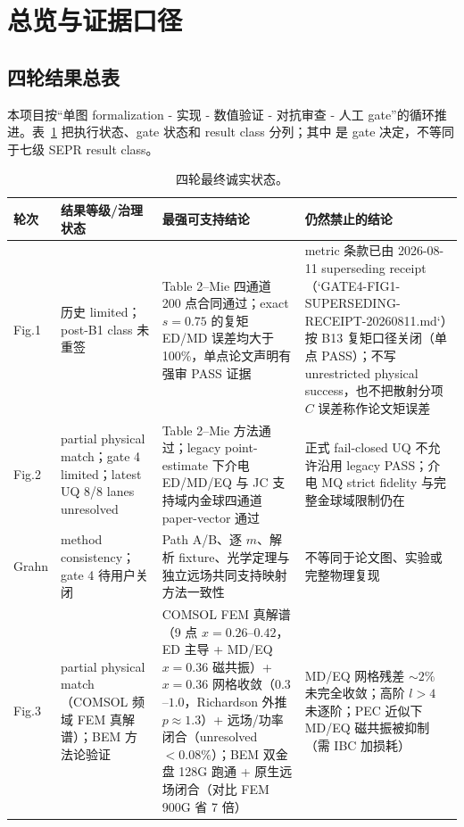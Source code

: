 \section{总览与证据口径}

\subsection{四轮结果总表}

本项目按“单图 formalization - 实现 - 数值验证 - 对抗审查 - 人工 gate”的循环推进。表~\ref{tab:overview} 把执行状态、gate 状态和 result class 分列；其中  是 gate 决定，不等同于七级 SEPR result class。

\begin{table}[H]
\centering
\small
\begin{tabularx}{\textwidth}{p{1.35cm}p{2.45cm}X p{3.2cm}}
\toprule
轮次 & 结果等级/治理状态 & 最强可支持结论 & 仍然禁止的结论 \\
\midrule
Fig.1 & 历史 limited；post-B1 class 未重签 & Table 2--Mie 四通道 200 点合同通过；exact $s=0.75$ 的复矩 ED/MD 误差均大于 100\%，单点论文声明有强审 PASS 证据 & metric 条款已由 2026-08-11 superseding receipt（`GATE4-FIG1-SUPERSEDING-RECEIPT-20260811.md`）按 B13 复矩口径关闭（单点 PASS）；不写 unrestricted physical success，也不把散射分项 $C$ 误差称作论文矩误差 \\
Fig.2 & partial physical match；gate 4 limited；latest UQ 8/8 lanes unresolved & Table 2--Mie 方法通过；legacy point-estimate 下介电 ED/MD/EQ 与 JC 支持域内金球四通道 paper-vector 通过 & 正式 fail-closed UQ 不允许沿用 legacy PASS；介电 MQ strict fidelity 与完整金球域限制仍在 \\
Grahn & method consistency；gate 4 待用户关闭 & Path A/B、逐 $m$、解析 fixture、光学定理与独立远场共同支持映射方法一致性 & 不等同于论文图、实验或完整物理复现 \\
Fig.3 & partial physical match（COMSOL 频域 FEM 真解谱）；BEM 方法论验证 & COMSOL FEM 真解谱（9 点 $x=0.26$--$0.42$，ED 主导 + MD/EQ $x=0.36$ 磁共振）+ $x=0.36$ 网格收敛（$0.3$--$1.0$，Richardson 外推 $p\approx1.3$）+ 远场/功率闭合（unresolved $<0.08\%$）；BEM 双金盘 128G 跑通 + 原生远场闭合（对比 FEM 900G 省 7 倍） & MD/EQ 网格残差 $\sim2\%$ 未完全收敛；高阶 $l>4$ 未逐阶；PEC 近似下 MD/EQ 磁共振被抑制（需 IBC 加损耗） \\
\bottomrule
\end{tabularx}
\caption{四轮最终诚实状态。}
\label{tab:overview}
\end{table}

